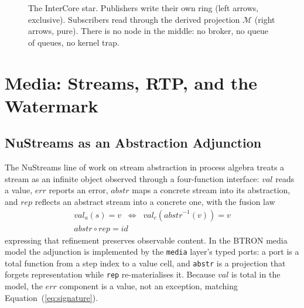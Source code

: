 \documentclass[10pt,journal,compsoc,twocolumn]{article}
\theoremstyle{definition}
\theoremstyle{remark}
\theoremstyle{plain}
\newcommand{\BTr}{\textsc{BTRON}}
\newcommand{\ctr}[1]{\texttt{#1}}
\begin{document}
\begin{figure}[h]
\centering
{}
\caption{The InterCore star. Publishers write their own ring (left arrows, exclusive). Subscribers read through the derived projection \(\mathcal{M}\) (right arrows, pure). There is no node in the middle: no broker, no queue of queues, no kernel trap.}
\label{fig:star}
\end{figure}

\section{Media: Streams, RTP, and the Watermark}
\label{sec:media}

\subsection{NuStreams as an Abstraction Adjunction}
The NuStreams line of work on stream abstraction in process algebra treats a stream as an infinite object observed through a four-function interface: \(\mathit{val}\) reads a value, \(\mathit{err}\) reports an error, \(\mathit{abstr}\) maps a concrete stream into its abstraction, and \(\mathit{rep}\) reflects an abstract stream into a concrete one, with the fusion law
\begin{equation}
\label{eq:nustream}
\begin{gathered}
\mathit{val}_a(s) = v \;\;\Longleftrightarrow\;\; \mathit{val}_c(\mathit{abstr}^{-1}(v)) = v \\
\mathit{abstr} \circ \mathit{rep} = \mathit{id}
\end{gathered}
\end{equation}
expressing that refinement preserves observable content. In the \BTr{} media model the adjunction is implemented by the \ctr{media} layer's typed ports: a port is a total function from a step index to a value cell, and \ctr{abstr} is a projection that forgets representation while \ctr{rep} re-materialises it. Because \(\mathit{val}\) is total in the model, the \(\mathit{err}\) component is a value, not an exception, matching Equation~(\ref{eq:signature}).
\end{document}
